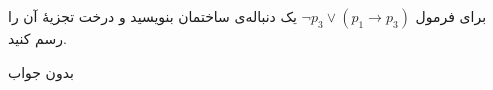 برای فرمول
$\neg p_3\vee (p_1\to p_3)$
یک دنباله‌ی ساختمان بنویسید و درخت تجزیهٔ آن را رسم کنید.
\begin{ans}
بدون جواب
\end{ans}
